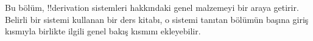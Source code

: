 \documentclass[../../../include/open-logic-chapter]{subfiles}
\begin{document}
      {}
      {}

\begin{editorial}
Bu bölüm, !!{derivation} sistemleri hakkındaki genel malzemeyi bir araya
getirir. Belirli bir sistemi kullanan bir ders kitabı, o sistemi tanıtan
bölümün başına giriş kısmıyla birlikte ilgili genel bakış kısmını ekleyebilir.
\end{editorial}






\OLEndChapterHook
\end{document}
